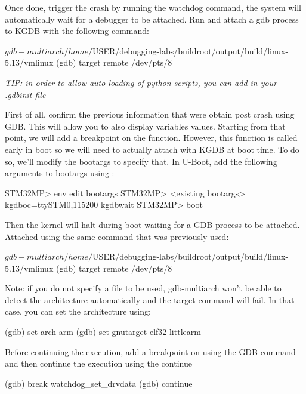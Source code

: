 Once done, trigger the crash by running the watchdog command, the system will
automatically wait for a debugger to be attached. Run  and
attach a gdb process to KGDB with the following command:

\begin{bashinput}
$ gdb-multiarch /home/$USER/debugging-labs/buildroot/output/build/linux-5.13/vmlinux
(gdb) target remote /dev/pts/8
\end{bashinput}

{\em TIP: in order to allow auto-loading of python scripts, you can add
 in your .gdbinit file}

First of all, confirm the previous information that were obtain post crash using
GDB. This will allow you to also display variables values. Starting from that
point, we will add a breakpoint on the  function.
However, this function is called early in boot so we will need to actually
attach with KGDB at boot time. To do so, we'll modify the bootargs to specify
that. In U-Boot, add the following arguments to bootargs using :

\begin{bashinput}
STM32MP> env edit bootargs
STM32MP> <existing bootargs> kgdboc=ttySTM0,115200 kgdbwait
STM32MP> boot
\end{bashinput}

Then the kernel will halt during boot waiting for a GDB process to be attached.
Attached using the same command that was previously used:

\begin{bashinput}
$ gdb-multiarch /home/$USER/debugging-labs/buildroot/output/build/linux-5.13/vmlinux
(gdb) target remote /dev/pts/8
\end{bashinput}

Note: if you do not specify a file to be used, gdb-multiarch won't be able to
detect the architecture automatically and the target command will fail. In that
case, you can set the architecture using:

\begin{bashinput}
(gdb) set arch arm
(gdb) set gnutarget elf32-littlearm
\end{bashinput}

Before continuing the execution, add a breakpoint on
 using the  GDB command and then
continue the execution using the continue 

\begin{bashinput}
(gdb) break watchdog_set_drvdata
(gdb) continue
\end{bashinput}

